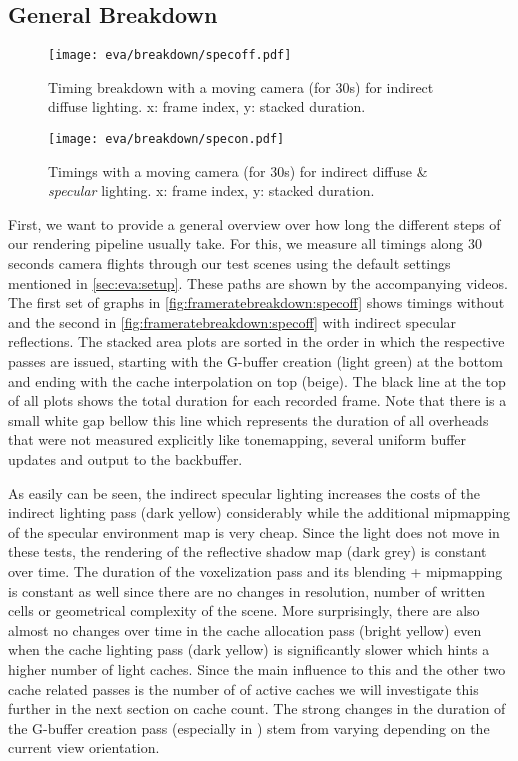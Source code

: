 \documentclass[thesis.tex]{subfiles}
\begin{document}
\subsection{General Breakdown}
\begin{figure}
\centering
\texttt{[image: eva/breakdown/specoff.pdf]}
\caption{Timing breakdown with a moving camera (for 30s) for indirect diffuse lighting. x: frame index, y: stacked duration.}
\label{fig:frameratebreakdown:specoff}
\end{figure}
\begin{figure}
\centering
\texttt{[image: eva/breakdown/specon.pdf]}
\caption{Timings with a moving camera  (for 30s) for indirect diffuse \& \emph{specular} lighting. x: frame index, y: stacked duration.}
\label{fig:frameratebreakdown:specon}
\end{figure}

First, we want to provide a general overview over how long the different steps of our rendering pipeline usually take.
For this, we measure all timings along 30 seconds camera flights through our test scenes using the default settings mentioned in \autoref{sec:eva:setup}.
These paths are shown by the accompanying videos. 
The first set of graphs in \autoref{fig:frameratebreakdown:specoff} shows timings without and the second in \autoref{fig:frameratebreakdown:specoff} with indirect specular reflections.
The stacked area plots are sorted in the order in which the respective passes are issued, starting with the G-buffer creation (light green) at the bottom and ending with the cache interpolation on top (beige).
The black line at the top of all plots shows the total duration for each recorded frame.
Note that there is a small white gap bellow this line which represents the duration of all overheads that were not measured explicitly like tonemapping, several uniform buffer updates and output to the backbuffer.

As easily can be seen, the indirect specular lighting increases the costs of the indirect lighting pass (dark yellow) considerably while the additional mipmapping of the specular environment map is very cheap.
Since the light does not move in these tests, the rendering of the reflective shadow map (dark grey) is constant over time.
The duration of the voxelization pass and its blending + mipmapping is constant as well since there are no changes in resolution, number of written cells or geometrical complexity of the scene.
More surprisingly, there are also almost no changes over time in the cache allocation pass (bright yellow) even when the cache lighting pass (dark yellow) is significantly slower which hints a higher number of light caches.
Since the main influence to this and the other two cache related passes is the number of of active caches we will investigate this further in the next section on cache count. 
The strong changes in the duration of the G-buffer creation pass (especially in ) stem from varying depending on the current view orientation.
\end{document}
